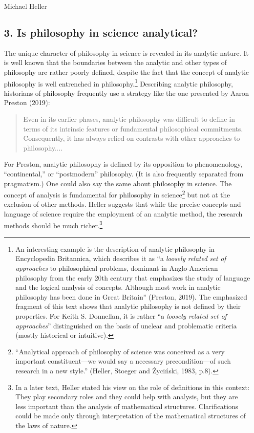 \begin{artengenv}{Michael Heller}
\subsection{3. Is philosophy in science analytical?}
The unique character of philosophy in science is revealed in its analytic nature. It is well known that the boundaries
between the analytic and other types of philosophy are rather poorly defined, despite the fact that the concept of
analytic philosophy is well entrenched in philosophy.\footnote{An interesting example is the description of analytic
philosophy in Encyclopedia Britannica, which describes it as “a \textit{loosely related set of approaches} to
philosophical problems, dominant in Anglo-American philosophy from the early 20th century that emphasizes the study of
language and the logical analysis of concepts. Although most work in analytic philosophy has been done in Great
Britain” (Preston, 2019). The emphasized fragment of this text shows that analytic philosophy is not defined by their
properties. For Keith S. Donnellan, it is rather “a \textit{loosely related set of approaches}” distinguished on the
basis of unclear and problematic criteria (mostly historical or intuitive).} Describing
analytic philosophy, historians of philosophy frequently use a strategy like the one presented by Aaron Preston (2019):


\begin{quotation}
Even in its earlier phases, analytic philosophy was difficult to define in terms of its intrinsic features or
fundamental philosophical commitments. Consequently, it has always relied on contrasts with other approaches to
philosophy.... 

\end{quotation}
For Preston, analytic philosophy is defined by its opposition to phenomenology, “continental,” or “postmodern”
philosophy. (It is also frequently separated from pragmatism.) One could also say the same about philosophy in science.
The concept of analysis is fundamental for philosophy in science\footnote{“Analytical approach of philosophy of science
was conceived as a very important constituent—we would say a necessary precondition—of such research in a new style.”
(Heller, Stoeger and Życiński, 1983, p.8).} but not at the exclusion of other methods. Heller suggests that while the
precise concepts and language of science require the employment of an analytic method, the research methods should be
much richer.\footnote{In a later text, Heller stated his view on the role of definitions in this context: They play
secondary roles and they could help with analysis, but they are less important than the analysis of mathematical
structures. Clarifications could be made only through interpretation of the mathematical structures of the laws of
nature.}


\end{artengenv}
